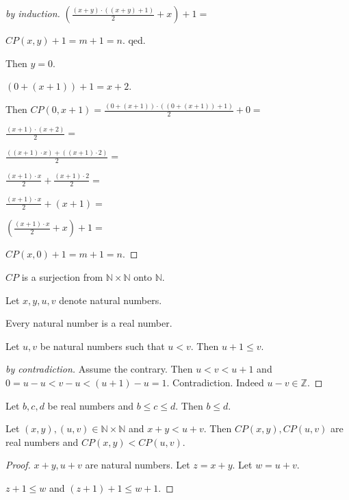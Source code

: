 \documentclass{article}
\begin{document}
\begin{forthel}
\begin{proof}[by induction]
$(\frac{(x+y)\cdot((x+y)+1)}{2} + x) + 1 =$

$CP(x,y) + 1 = m + 1 = n.$
qed.

Then $y = 0$.

$(0+(x+1))+1 = x + 2$.

Then $CP(0,x+1) = \frac{(0+(x+1)) \cdot ((0+(x+1))+1)}{2} + 0 =$

$\frac{(x+1) \cdot (x+2)}{2} =$

$\frac{((x+1) \cdot x) + ((x+1) \cdot 2)}{2} = $

$\frac{(x+1) \cdot x}{2} + \frac{(x+1) \cdot 2}{2} =$

$\frac{(x+1) \cdot x}{2} + (x+1) =$

$(\frac{(x+1) \cdot x}{2} + x) +1 =$

$CP(x,0) + 1 = m + 1 = n$.
\end{proof}

\begin{lemma}
$CP$ is a surjection from $\mathbb{N} \times \mathbb{N}$ onto $\mathbb{N}$.
\end{lemma}

Let $x,y,u,v$ denote natural numbers.

\begin{lemma}
Every natural number is a real number.
\end{lemma}

\begin{lemma}
Let $u,v$ be natural numbers such that $u < v$. Then $u + 1 \leq v$.
\end{lemma}
\begin{proof}[by contradiction]
Assume the contrary.
Then $u < v < u+1$
and $0 = u - u < v - u < (u+1) - u = 1$.
Contradiction. Indeed $u - v \in \mathbb{Z}$.

\end{proof}

\begin{lemma}
Let $b,c,d$ be real numbers and $b \leq c \leq d$.
Then $b \leq d$.
\end{lemma}



\begin{lemma}
Let $(x,y), (u,v) \in \mathbb{N} \times \mathbb{N}$ and $x+y < u+v$. Then 
$CP(x,y),CP(u,v)$ are real numbers and $CP(x,y) < CP(u,v)$.
\end{lemma}
\begin{proof}
$x+y, u+v$ are natural numbers.
Let $z = x + y$. Let $w = u + v$.

$z+1 \leq w$ and $(z+1)+1 \leq w+1$.


\end{proof}
\end{forthel}
\end{document}
